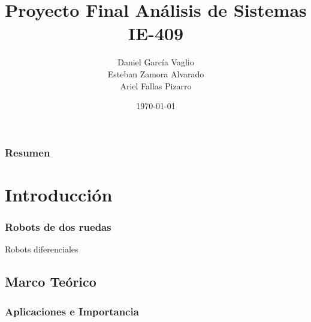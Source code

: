 \documentclass{beamer}
\title[Modelado de Robots de 2 Ruedas]{{\tiny Proyecto Final Análisis de Sistemas}\\ IE-409} %
\author{Daniel García Vaglio\\Esteban Zamora Alvarado\\Ariel Fallas Pizarro} %
\institute[UCR] %
{
Universdad de Costa Rica \\ %
\medskip
}
\date{\today} %
\begin{document}
\begin{frame}
\titlepage %
\end{frame}

\begin{frame}
\frametitle{Resumen} 	%
\tableofcontents 		%
\end{frame}


\section{Introducción} %

\begin{frame}
\frametitle{Robots de dos ruedas}
Robots diferenciales
\begin{figure}[h]
\centering
\end{figure}
\end{frame}

\subsection{Marco Teórico}
\begin{frame}
\frametitle{Aplicaciones e Importancia}

\begin{columns}[c] %
	\begin{figure}[h]
		\centering
        \end{figure}
	
	\begin{figure}[h]
		\centering
	\end{figure}
\end{columns}
\end{frame}
\end{document}
